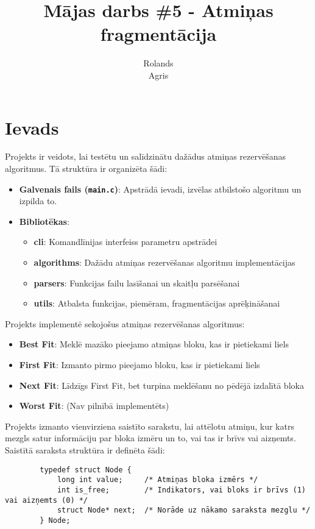 \documentclass{report}
\title{Mājas darbs \#5 - Atmiņas fragmentācija}
\author{Rolands \\ Agris}
\date{}
\begin{document}
	
	\maketitle
	
	\section{Ievads}
	
	Projekts ir veidots, lai testētu un salīdzinātu dažādus atmiņas rezervēšanas algoritmus. Tā struktūra ir organizēta šādi:
	
	\begin{itemize}
		\item \textbf{Galvenais fails (\texttt{main.c})}: Apstrādā ievadi, izvēlas atbilstošo algoritmu un izpilda to.
		\item \textbf{Bibliotēkas}:
		\begin{itemize}
			\item \textbf{cli}: Komandlīnijas interfeiss parametru apstrādei
			\item \textbf{algorithms}: Dažādu atmiņas rezervēšanas algoritmu implementācijas
			\item \textbf{parsers}: Funkcijas failu lasīšanai un skaitļu parsēšanai
			\item \textbf{utils}: Atbalsta funkcijas, piemēram, fragmentācijas aprēķināšanai
		\end{itemize}
	\end{itemize}
	
	Projekts implementē sekojošus atmiņas rezervēšanas algoritmus:
	\begin{itemize}
		\item \textbf{Best Fit}: Meklē mazāko pieejamo atmiņas bloku, kas ir pietiekami liels
		\item \textbf{First Fit}: Izmanto pirmo pieejamo bloku, kas ir pietiekami liels
		\item \textbf{Next Fit}: Līdzīgs First Fit, bet turpina meklēšanu no pēdējā izdalītā bloka
		\item \textbf{Worst Fit}: (Nav pilnībā implementēts)
	\end{itemize}
	
	Projekts izmanto vienvirziena saistīto sarakstu, lai attēlotu atmiņu, kur katrs mezgls satur informāciju par bloka izmēru un to, vai tas ir brīvs vai aizņemts. Saistītā saraksta struktūra ir definēta šādi:
	
	\begin{verbatim}
		typedef struct Node {
			long int value;     /* Atmiņas bloka izmērs */
			int is_free;        /* Indikators, vai bloks ir brīvs (1) vai aizņemts (0) */
			struct Node* next;  /* Norāde uz nākamo saraksta mezglu */
		} Node;
	\end{verbatim}
	
\end{document}
